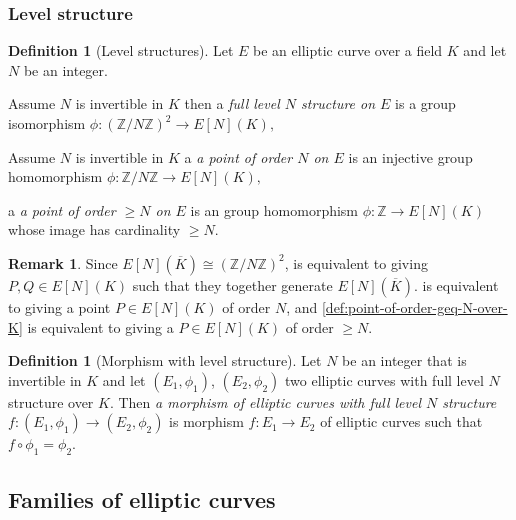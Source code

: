 \documentclass[a4paper,12pt,reqno]{amsart}
\newcommand{\field}[1]{\mathbb{#1}}  %
\newcommand{\Z}{\field{Z}} %
\theoremstyle{definition}
\newtheorem{definition}[lemma]{Definition}
\newtheorem{remark}[lemma]{Remark}
\numberwithin{lemma}{section}
\numberwithin{equation}{section}
\numberwithin{figure}{section}
\begin{document}
\subsubsection{Level structure}

\begin{definition}[Level structures]
	Let $E$ be an elliptic curve over a field $K$ and let $N$ be an integer. 
	\begin{defenum}
		\item Assume $N$ is invertible in $K$ then a \textit{full level $N$ structure on $E$} is a group isomorphism $\phi: (\Z/N\Z)^2 \to  E[N](K),$ \label{def:full-level-structure-over-K}
		\item Assume $N$ is invertible in $K$  a \textit{a point of order $N$ on $E$} is an injective group homomorphism $\phi: \Z/N\Z \to  E[N](K),$ \label{def:point-of-order-N-over-K}
		\item  a \textit{a point of order $\geq N$ on $E$} is an group homomorphism $\phi: \Z \to  E[N](K)$ whose image has cardinality $\geq N$. \label{def:point-of-order-geq-N-over-K}
	\end{defenum}
\end{definition}
\begin{remark}
Since $E[N](\overline K) \cong  (\Z/N\Z)^2$,  is equivalent to giving $P,Q \in E[N](K)$ such that they together generate $E[N](\overline K)$.  is equivalent to giving a point $P \in E[N](K)$ of order $N$, and \cref{def:point-of-order-geq-N-over-K} is equivalent to giving a $P \in E[N](K)$ of order $\geq N$.
\end{remark}

\begin{definition}[Morphism with level structure]
Let $N$ be an integer that is invertible in $K$ and let $(E_1,\phi_1)$, $(E_2,\phi_2)$ two elliptic curves with full level $N$ structure over $K$. Then \textit{a morphism of elliptic curves with full level $N$ structure}  $f: (E_1,\phi_1) \to (E_2,\phi_2)$ is morphism $f: E_1 \to E_2$ of elliptic curves such that $f \circ \phi_1 = \phi_2$.
\end{definition}



\subsection{Families of elliptic curves}
\end{document}
